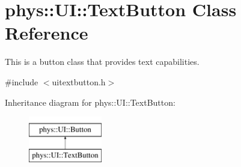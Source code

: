 \hypertarget{classphys_1_1UI_1_1TextButton}{
\section{phys::UI::TextButton Class Reference}
\label{df/d03/classphys_1_1UI_1_1TextButton}
}


This is a button class that provides text capabilities.  




{\ttfamily \#include $<$uitextbutton.h$>$}

Inheritance diagram for phys::UI::TextButton:\begin{figure}[H]
\begin{center}
\leavevmode
\includegraphics[height=2.000000cm]{df/d03/classphys_1_1UI_1_1TextButton}
\end{center}
\end{figure}
